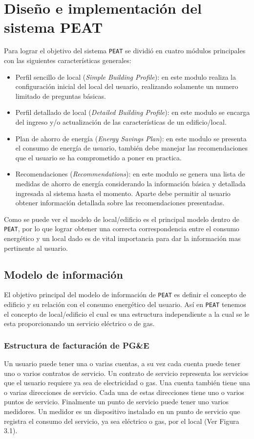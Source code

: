 \chapter{Diseño e implementación del sistema PEAT}

Para lograr el objetivo del sistema \texttt{PEAT} se dividió en cuatro
módulos principales con las siguientes características generales:

\begin{itemize}
\item Perfil sencillo de local (\textit{Simple Building Profile}): en este modulo realiza
  la configuración inicial del local del usuario, realizando solamente un numero limitado
  de preguntas básicas.
\item Perfil detallado de local (\textit{Detailed Building Profile}): en este modulo se
  encarga del ingreso y/o actualización de las características de un edificio/local.
\item Plan de ahorro de energía (\textit{Energy Savings Plan}): en este modulo se
  presenta el consumo de energía de usuario, también debe manejar las recomendaciones
  que el usuario se ha comprometido a poner en practica.
\item Recomendaciones (\textit{Recommendations}): en este modulo se genera una lista
  de medidas de ahorro de energía considerando la información básica y detallada
  ingresada al sistema hasta el momento. Aparte debe permitir al usuario obtener
  información detallada sobre las recomendaciones presentadas.
\end{itemize}

Como se puede ver el modelo de local/edificio es el principal modelo dentro de
\texttt{PEAT}, por lo que lograr obtener una correcta correspondencia entre
el consumo energético y un local dado es de vital importancia para dar la
información mas pertinente al usuario.

\section{Modelo de información}

El objetivo principal del modelo de información de \texttt{PEAT} es definir el
concepto de edificio y su relación con el consumo energético del usuario. Así en
\texttt{PEAT} tenemos el concepto de local/edificio el cual es una estructura
independiente a la cual se le esta proporcionando un servicio eléctrico o de gas.

\subsection{Estructura de facturación de PG\&E}
Un usuario puede tener una o varias cuentas, a su vez cada cuenta puede tener uno o varios
contratos de servicio. Un contrato de servicio representa los servicios que el usuario
requiere ya sea de electricidad o gas. Una cuenta también tiene una o varias direcciones de
servicio.
Cada una de estas direcciones tiene uno o varios puntos de servicio. Finalmente un punto
de servicio puede tener uno varios medidores. Un medidor es un dispositivo instalado en un
punto de servicio que registra el consumo del servicio, ya sea eléctrico o gas, por el local
(Ver Figura 3.1).

